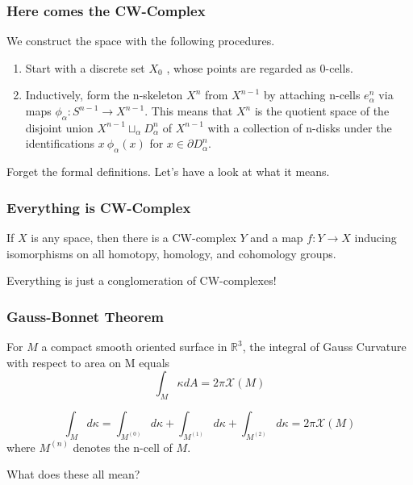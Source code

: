 \documentclass{beamer}
\begin{document}
\begin{frame}
	\frametitle{Here comes the CW-Complex}
	\begin{definition}[CW-Complex]
		We construct the space with the following procedures. 
		\begin{enumerate}
			\item Start with a discrete set $X_0$ , whose points are regarded as 0-cells.
			\item Inductively, form the n-skeleton $X^n$ from $X^{n - 1}$ by attaching n-cells $e^n_\alpha$ via maps $\phi_\alpha: S^{n-1} \to X^{n-1}$. This means that $X^n$ is the quotient space of the disjoint union $X^{n-1} \sqcup_\alpha D^n_\alpha$ of $X^{n-1}$ with a collection of n-disks under the identifications $x ~ \phi_\alpha(x)$ for $x \in \partial D^n_\alpha$.
		\end{enumerate}
	\end{definition}
	Forget the formal definitions. Let's have a look at what it means.
\end{frame}

\begin{frame}
	\frametitle{Everything is CW-Complex}
	\begin{theorem}
		If $X$ is any space, then there is a CW-complex $Y$ and a map $f:Y \to X$ inducing isomorphisms on all homotopy, homology, and cohomology groups.
	\end{theorem}
	Everything is just a conglomeration of CW-complexes!
\end{frame}

\begin{frame}
	\frametitle{Gauss-Bonnet Theorem}
	\begin{theorem}
		For $M$ a compact smooth oriented surface in $\mathbb{R}^3$, the integral of Gauss Curvature with respect to area on M equals
		\[
			\int_M \kappa dA = 2\pi \mathcal{X}(M)
		\]
	\end{theorem}
	\pause
	\begin{theorem}
		\[
			\int_M d\kappa = \int_{M^(0)} d\kappa + \int_{M^(1)} d\kappa + \int_{M^(2)} d\kappa = 2\pi \mathcal{X}(M)
		\]
		where $M^{(n)}$ denotes the n-cell of $M$.
	\end{theorem}
	\pause
	What does these all mean?
\end{frame}
\end{document}
